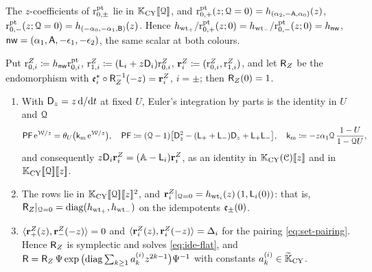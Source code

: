 \begin{lem}[{\Lref{Lemma~5.12}: normalisation constants at $\cQ=0$}]
\label{lem:ide-norm}
The $z$-coefficients of $\mathrm{r}^{\mathrm{pt}}_{0,\pm}$ lie in $\mathbb{K}_{\mathrm{CY}}[\![ \mathcal{Q} ]\!]$, and $\mathrm{r}^{\mathrm{pt}}_{0,+}(z;\mathcal{Q}=0)=h_{(\alpha_2,-\mathsf{A},\alpha_0)}(z)$, $\mathrm{r}^{\mathrm{pt}}_{0,-}(z;\mathcal{Q}=0)=h_{(-\alpha_0,-\alpha_1,\mathsf{B})}(z)$. Hence $h_{\mathrm{wt}_+}/\mathrm{r}^{\mathrm{pt}}_{0,+}(z;0)=h_{\mathrm{wt}_-}/\mathrm{r}^{\mathrm{pt}}_{0,-}(z;0)=h_{\mathsf{nw}}$, $\mathsf{nw}=(\alpha_1,\mathsf{A},-\epsilon_1,-\epsilon_2)$, the same scalar at both colours.
\end{lem}

Put $\mathrm{r}^{Z}_{0,i}\coloneqq h_{\mathsf{nw}}\mathrm{r}^{\mathrm{pt}}_{0,i}$, $\mathrm{r}^{Z}_{1,i}\coloneqq(\mathsf{L}_i+z\mathsf{D}_i)\mathrm{r}^{Z}_{0,i}$, $\mathbf{r}^Z_i\coloneqq(\mathrm{r}^{Z}_{0,i},\mathrm{r}^{Z}_{1,i})$, and let $\mathsf{R}_{Z}$ be the endomorphism with $\mathfrak{e}_i^*\circ\mathsf{R}_{Z}^{-1}(-z)=\mathbf{r}^Z_i$, $i=\pm$; then $\mathsf{R}_{Z}(0)=1$.

\begin{prop}
\label{prop:ide-rows}
\begin{enumerate}
\item With $\mathsf{D}_{z}=z\,\mathrm{d}/\mathrm{d} t$ at fixed $U$, Euler's integration by parts is the identity in $U$ and $\mathcal{Q}$
\begin{equation}
\label{eq:ide-euler}
\mathsf{PF}\,\mathrm{e}^{\mathcal{W}/z}=\theta_{U}\big(\mathsf{k}_{\mathrm{m}}\,\mathrm{e}^{\mathcal{W}/z}\big),\quad \mathsf{PF}\coloneqq(\mathcal{Q}-1)\big[\mathsf{D}_{z}^2-(\mathsf{L}_++\mathsf{L}_-)\mathsf{D}_{z}+\mathsf{L}_+\mathsf{L}_-\big],\quad \mathsf{k}_{\mathrm{m}}\coloneqq-z\alpha_1\mathcal{Q}\,\frac{1-U}{1-\mathcal{Q} U},
\end{equation}
and consequently $z\mathsf{D}_i\mathbf{r}^Z_i=(\mathbb{A}-\mathsf{L}_i)\mathbf{r}^Z_i$, as an identity in $\mathbb{K}_{\mathrm{CY}}(\mathcal{C})[\![ z ]\!]$ and in $\mathbb{K}_{\mathrm{CY}}[\![ \mathcal{Q} ]\!][\![ z ]\!]$.
\item The rows lie in $\mathbb{K}_{\mathrm{CY}}[\![ \mathcal{Q} ]\!][\![ z ]\!]^2$, and $\mathbf{r}^Z_i|_{\mathcal{Q}=0}=h_{\mathrm{wt}_i}(z)\,(1,\mathsf{L}_i(0))$: that is, $\mathsf{R}_{Z}|_{\mathcal{Q}=0}=\mathrm{diag}(h_{\mathrm{wt}_+},h_{\mathrm{wt}_-})$ on the idempotents $\mathfrak{e}_\pm(0)$.
\item $\langle\mathbf{r}^Z_+(z),\mathbf{r}^Z_-(-z)\rangle=0$ and $\langle\mathbf{r}^Z_i(z),\mathbf{r}^Z_i(-z)\rangle=\Delta_i$ for the pairing \eqref{eq:set-pairing}. Hence $\mathsf{R}_{Z}$ is symplectic and solves \eqref{eq:ide-flat}, and $\mathsf{R}=\mathsf{R}_{Z}\,\Psi\exp\big(\mathrm{diag}\sum_{k\geq1}a_k^{(i)}z^{2k-1}\big)\Psi^{-1}$ with constants $a_k^{(i)}\in\widetilde{\mathbb{K}}_{\mathrm{CY}}$.
\end{enumerate}
\end{prop}

